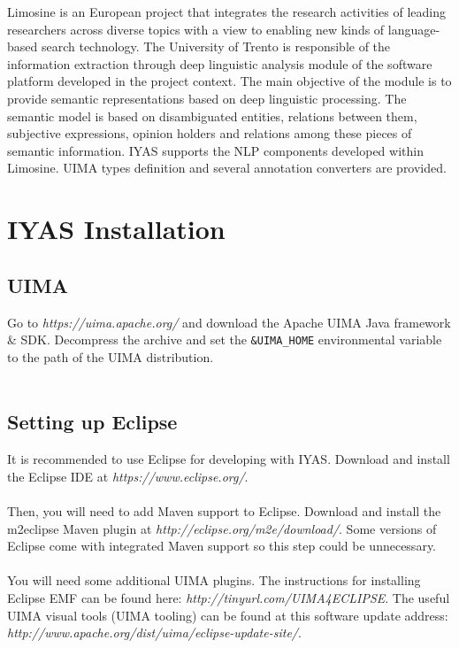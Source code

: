 \documentclass{wileysev}
\begin{document}
Limosine is an European project that integrates the research activities of leading researchers across diverse topics with a view to enabling new kinds of language-based search technology. The University of Trento is responsible of the information extraction through deep linguistic analysis module of the software platform developed in the project context. The main objective of the module is to provide semantic representations based on deep linguistic processing. The semantic model is based on disambiguated entities, relations between them, subjective expressions, opinion holders and relations among these pieces of semantic information. IYAS supports the NLP components developed within Limosine. UIMA types definition and several annotation converters are provided.

\chapter[IYAS Installation]
{IYAS Installation}

\section[UIMA]{UIMA}

Go to \textit{https://uima.apache.org/} and download the Apache UIMA Java framework \& SDK. Decompress the archive and set the \texttt{\&UIMA\_HOME} environmental variable to the path of the UIMA distribution.
\\\\
\section[Setting up Eclipse]{Setting up Eclipse}
It is recommended to use Eclipse for developing with IYAS. Download and install the Eclipse IDE at \textit{https://www.eclipse.org/}.
\\\\
Then, you will need to add Maven support to Eclipse. Download and install the m2eclipse Maven plugin at \textit{http://eclipse.org/m2e/download/}. Some versions of Eclipse come with integrated Maven support so this step could be unnecessary.
\\\\
You will need some additional UIMA plugins. The instructions for installing Eclipse EMF can be found here: \textit{http://tinyurl.com/UIMA4ECLIPSE}. The useful UIMA visual tools (UIMA tooling) can be found at this software update address:\\ \textit{http://www.apache.org/dist/uima/eclipse-update-site/}.
\end{document}
